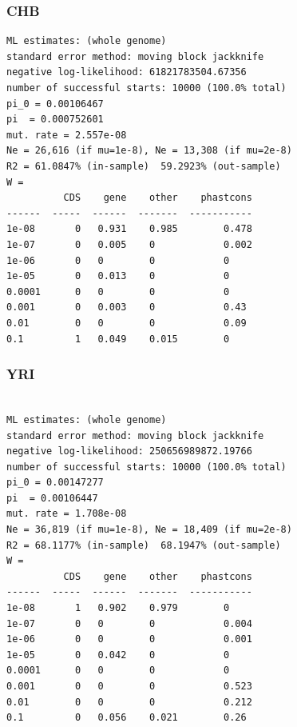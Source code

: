 \documentclass[11pt]{article}
\begin{document}
\subsubsection*{CHB}
\begin{minipage}{\linewidth}\begin{footnotesize}
\begin{verbatim}
ML estimates: (whole genome)
standard error method: moving block jackknife
negative log-likelihood: 61821783504.67356
number of successful starts: 10000 (100.0% total)
pi_0 = 0.00106467
pi  = 0.000752601
mut. rate = 2.557e-08 
Ne = 26,616 (if mu=1e-8), Ne = 13,308 (if mu=2e-8)
R2 = 61.0847% (in-sample)  59.2923% (out-sample)
W = 
          CDS    gene    other    phastcons
------  -----  ------  -------  -----------
1e-08       0   0.931    0.985        0.478
1e-07       0   0.005    0            0.002
1e-06       0   0        0            0
1e-05       0   0.013    0            0
0.0001      0   0        0            0
0.001       0   0.003    0            0.43
0.01        0   0        0            0.09
0.1         1   0.049    0.015        0
\end{verbatim}
\end{footnotesize}\end{minipage}


\subsubsection*{YRI}
\begin{minipage}{\linewidth}\begin{footnotesize}
\begin{verbatim}

ML estimates: (whole genome)
standard error method: moving block jackknife
negative log-likelihood: 250656989872.19766
number of successful starts: 10000 (100.0% total)
pi_0 = 0.00147277
pi  = 0.00106447
mut. rate = 1.708e-08 
Ne = 36,819 (if mu=1e-8), Ne = 18,409 (if mu=2e-8)
R2 = 68.1177% (in-sample)  68.1947% (out-sample)
W = 
          CDS    gene    other    phastcons
------  -----  ------  -------  -----------
1e-08       1   0.902    0.979        0
1e-07       0   0        0            0.004
1e-06       0   0        0            0.001
1e-05       0   0.042    0            0
0.0001      0   0        0            0
0.001       0   0        0            0.523
0.01        0   0        0            0.212
0.1         0   0.056    0.021        0.26
\end{verbatim}
\end{footnotesize}\end{minipage}
\end{document}
